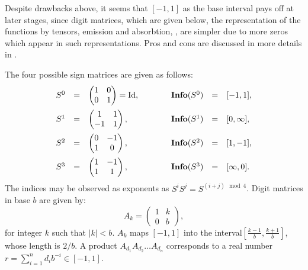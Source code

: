 \documentclass[11pt,a4paper]{article}
\begin{document}
Despite drawbacks above, it seems that $[-1,1]$ as the base interval
	pays off at later stages, since digit matrices, which are given below,
	the representation of the functions by tensors, emission and absorbtion,
	\cite{edapot97, pot98}, are simpler due to more zeros which appear in
	such representations. Pros and cons are discussed in more details in
	\cite{hec99}.

The four possible sign matrices are given as follows:
	\[ \begin{array}{rclcrcl}
		S^0 &=& \begin{pmatrix} 1&0 \\ 0&1 \end{pmatrix} = \textrm{Id}, &\qquad&
			\textbf{Info}(S^0) &=& [-1,1], \vspace{0.5em} \\
		S^1 &=& \begin{pmatrix} 1&1 \\ -1&1 \end{pmatrix}, &\qquad&
			\textbf{Info}(S^1) &=& [0,\infty], \vspace{0.5em} \\
		S^2 &=& \begin{pmatrix} 0&-1 \\ 1&0 \end{pmatrix}, &\qquad&
			\textbf{Info}(S^2) &=& [1,-1], \vspace{0.5em} \\
		S^3 &=& \begin{pmatrix} 1&-1 \\ 1&1 \end{pmatrix}, &\qquad&
			\textbf{Info}(S^3) &=& [\infty,0].
	\end{array} \]
	The indices may be observed as exponents as $S^i S^j = S^{(i+j) \mod 4}$.
	Digit matrices in base $b$ are given by:
	\[ A_k = \begin{pmatrix} 1&k\\ 0&b \end{pmatrix}, \]
	for integer $k$ such that $|k| < b$. $A_k$ maps $[-1,1]$ into
	the interval$[\frac{k-1}{b},\frac{k+1}{b}]$, whose length is $2/b$.
	A product $A_{d_1} A_{d_2} \ldots A_{d_n}$ corresponds to a real number
	$r = \sum_{i=1}^n d_i b^{-i} \in [-1,1]$.
\end{document}
